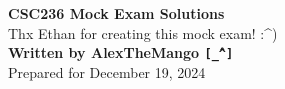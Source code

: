 \begin{titlepage}
    \null %
    \vfill
    \begin{center}
        {\fontsize{40}{48}\selectfont \bfseries CSC236 Mock Exam Solutions}
        \vspace{20pt} \\
        {\LARGE Thx Ethan for creating this mock exam! \textsf{:\^{})}} \\
        \vspace{20pt}
        \textbf{Written by AlexTheMango \texttt{[\^\_\^{}]}}
        \vspace{8pt}
        \\ Prepared for December 19, 2024
    \end{center}
    \vfill
\end{titlepage}
